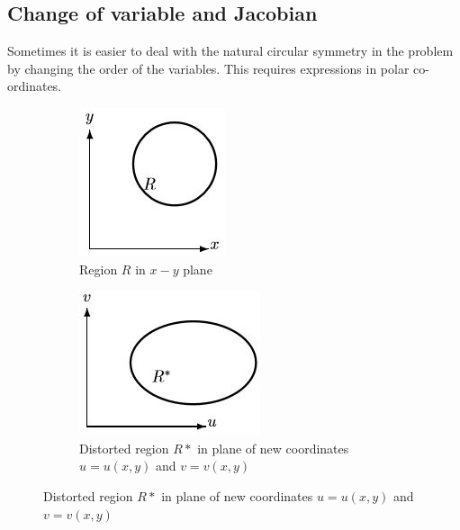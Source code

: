 \documentclass[10pt,a4paper]{article}
\begin{document}
\subsection{Change of variable and Jacobian}

Sometimes it is easier to deal with the natural circular symmetry in the problem by changing the
order of the variables. This requires expressions in polar co-ordinates. 

\begin{figure}
\centering
\begin{subfigure}{.5\textwidth}
  \centering
  \includegraphics[width=.4\linewidth]{Jacob1.JPG}
  \caption{Region $R$ in $x-y$ plane}
  \label{fig:sub1}
\end{subfigure}%
\begin{subfigure}{.5\textwidth}
  \centering
  \includegraphics[width=.4\linewidth]{Jacob2.JPG}
  \caption{Distorted region $R*$ in plane of new coordinates $u=u(x,y)$ and $v=v(x,y)$}
  \label{fig:sub2}
\end{subfigure}
\label{fig:test}
\end{figure}
\end{document}
